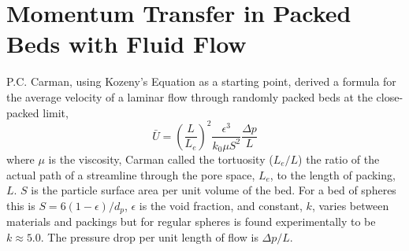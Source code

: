 
\FloatBarrier



%
%
\section{Momentum Transfer in Packed Beds with Fluid Flow} \label{sec:modeling-pressure-drop}








P.C. Carman\cite{Carman1997}, using Kozeny's Equation as a starting point, derived a formula for the average velocity of a laminar flow through randomly packed beds at the close-packed limit,
\begin{equation}\label{eq:K-C-velocity}
    \bar{U} = \left(\frac{L}{L_e}\right)^2\frac{\epsilon^3}{k_0\mu S^2}\frac{\Delta p}{L}
\end{equation}
where $\mu$ is the viscosity, Carman called the tortuosity ($L_e/L$) the ratio of the actual path of a streamline through the pore space, $L_e$, to the length of packing, $L$. $S$ is the particle surface area per unit volume of the bed. For a bed of spheres this is $S = 6(1-\epsilon)/d_p$, $\epsilon$ is the void fraction, and constant, $k$, varies between materials and packings but for regular spheres is found experimentally to be $k\approx 5.0$. The pressure drop per unit length of flow is $\Delta p/L$.

